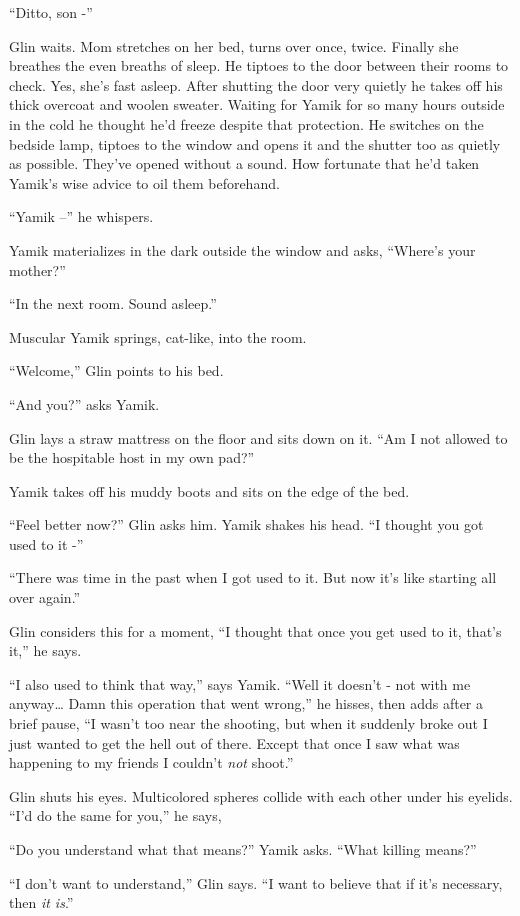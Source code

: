 \documentclass[twoside,11pt]{book}
\begin{document}
``Ditto, son -''

Glin waits. Mom stretches on her bed, turns over once, twice. Finally she breathes the even breaths of sleep. He tiptoes
to the door between their rooms to check. Yes, she's fast asleep. After shutting the door very quietly he takes off his
thick overcoat and woolen sweater. Waiting for Yamik for so many hours outside in the cold he thought he'd freeze
 despite that protection. He switches on the bedside lamp, tiptoes to the window and opens it and the shutter too as
quietly as possible. They've opened without a sound. How fortunate that
he'd taken Yamik's wise advice to
oil them beforehand.

 ``Yamik --'' he whispers.

Yamik materializes in the dark outside the window and asks, ``Where's your mother?''

``In the next room. Sound asleep.''

Muscular Yamik springs, cat-like, into the room.

``Welcome,'' Glin points to his bed.

``And you?'' asks Yamik.

Glin lays a straw mattress on the floor and sits down on it. ``Am I not allowed to be the hospitable host
in my own pad?''

Yamik takes off his muddy boots and sits on the edge of the bed.

``Feel better now?'' Glin asks him. Yamik shakes his
head. ``I thought you got used to it -''

``There was time in the past when I got used to it. But now it's like starting all over
again.''

Glin considers this for a moment, ``I thought that once you get used to it, that's it,'' he
says.

``I also used to think that way,'' says Yamik. ``Well it doesn't - not with me anyway{\dots} Damn this
operation that went wrong,'' he hisses, then adds after a brief pause, ``I wasn't too near
the shooting, but when it suddenly broke out I
just wanted to get the hell out of there. Except that once I saw what was
happening to my friends I couldn't \textit{not} shoot.''

Glin shuts his eyes. Multicolored spheres collide with each other under his eyelids. ``I'd do the same for
you,'' he says,

``Do you understand what that means?'' Yamik asks. ``What killing
means?''

``I don't want to understand,'' Glin says. ``I want to believe that if it's
necessary, then \textit{it is}.''
\end{document}
